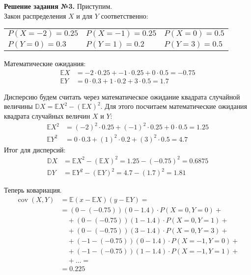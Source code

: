 \documentclass[a4paper, 12pt]{article}
\DeclareMathOperator{\cov}{cov}
\begin{document}
{\vspace{0.5cm}

\textbf{Решение задания №3.} Приступим. \\ 

Закон распределения $X$ и для $Y$ соответственно:
\begin{center}
    \begin{tabular}{lll}
        $P(X = -2) = 0.25$ & $P(X = -1) = 0.25$ & $P(X = 0) = 0.5$ \\
        $P(Y = 0) = 0.3$ & $P(Y = 1) = 0.2$ & $P(Y = 3) = 0.5$  
    \end{tabular}
\end{center}

  
Математические ожидания:
\begin{align*}
    \mathbb{E}X &= -2 \cdot 0.25 + -1 \cdot 0.25 + 0 \cdot 0.5 = -0.75 \\ 
    \mathbb{E}Y &= 0 \cdot 0.3 + 1 \cdot 0.2 + 3 \cdot 0.5 = 1.7
\end{align*}

Дисперсию будем считать через математическое ожидание квадрата случайной величины $\mathbb{D}X = \mathbb{E}X^2 - \left ( \mathbb{E}X \right )^2$. Для этого посчитаем математические ожидания квадрата случайных величин $X$ и $Y$:
\begin{align*}
    \mathbb{E}X^2 &= (-2)^2 \cdot 0.25 + (-1)^2 \cdot 0.25 + 0 \cdot 0.5 = 1.25 \\ 
    \mathbb{E}Y^2 &= 0 \cdot 0.3 + (1)^2 \cdot 0.2 + (3)^2 \cdot 0.5 = 4.7
\end{align*}
Итог для дисперсий:
\begin{align*}
    \mathbb{D}X &= \mathbb{E}X^2 - \left ( \mathbb{E}X \right )^2 = 1.25 - (-0.75)^2 = 0.6875 \\ 
    \mathbb{D}Y &= \mathbb{E}Y^2 - \left ( \mathbb{E}Y \right )^2 = 4.7 - (1.7)^2 = 1.81
\end{align*}

Теперь ковариация.
\begin{align*}
    \cov(X, Y) &= \mathbb{E} (x - \mathbb{E}X)(y - \mathbb{E}Y) =\\
    &= (0 - (-0.75))(0 - 1.4) \cdot P(X = 0, Y = 0) + \\
    &\quad+ (0 - (-0.75))(1 - 1.4) \cdot P(X = 0, Y = 1) + \\
    &\quad+ (0 - (-0.75))(3 - 1.4) \cdot P(X = 0, Y = 3) + \\
    &\quad+ (-1 - (-0.75))(0 - 1.4) \cdot P(X = -1, Y = 0) + \\
    &\quad+ (-1 - (-0.75))(1 - 1.4) \cdot P(X = -1, Y = 1) + \\
    &\quad+ \dots = \\ 
    &= 0.225    
\end{align*}

}
\end{document}
